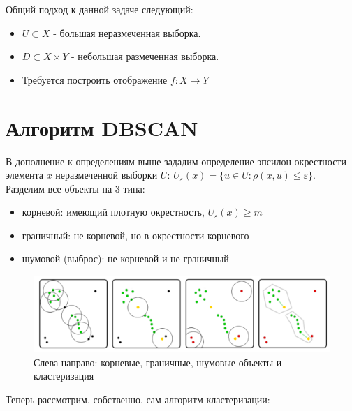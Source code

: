 Общий подход к данной задаче следующий:
\begin{itemize}
    \item $U \subset X$ - большая неразмеченная выборка.
    \item $ D \subset X \times Y$ - небольшая размеченная выборка.
    \item Требуется построить отображение $f : X \rightarrow Y$
\end{itemize}
\section*{Алгоритм DBSCAN}
В дополнение к определениям выше зададим определение эпсилон-окрестности элемента $x$ неразмеченной выборки $U$: $U_{\varepsilon}(x) = \{ u \in U: \rho(x, u) \leq \varepsilon \}$. Разделим все объекты на 3 типа:
\begin{itemize}
    \item корневой: имеющий плотную окрестность, $U_{\varepsilon}(x) \geq m$
    \item граничный: не корневой, но в окрестности корневого
    \item шумовой (выброс): не корневой и не граничный
\end{itemize}
\begin{figure}[h]
    \centering
    \includegraphics[width=0.47\linewidth]{objects.png}
    \caption{Слева направо: корневые, граничные, шумовые объекты и кластеризация}
    \label{fig:enter-label}
\end{figure}
\par
Теперь рассмотрим, собственно, сам алгоритм кластеризации:
